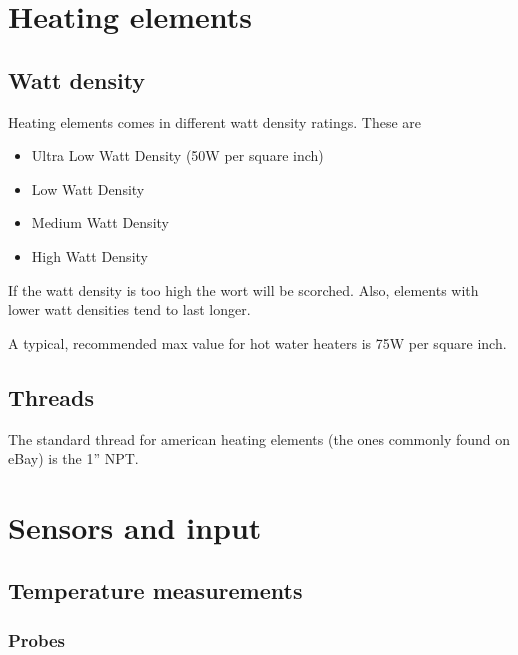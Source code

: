 \documentclass[11pt,fleqn,openany]{book} %
\begin{document}


\chapter{Heating elements}

\section{Watt density}

Heating elements comes in different watt density ratings. These are

\begin{itemize}
\item Ultra Low Watt Density (50W per square inch)
\item Low Watt Density
\item Medium Watt Density
\item High Watt Density\\
\end{itemize}

If the watt density is too high the wort will be scorched. Also, elements with lower watt densities tend to last longer.

A typical, recommended max value for hot water heaters is 75W per square inch.

\section{Threads}

The standard thread for american heating elements (the ones commonly found on eBay) is the 1'' NPT.



\chapter{Sensors and input}

\section{Temperature measurements}

\subsection{Probes}
\end{document}
